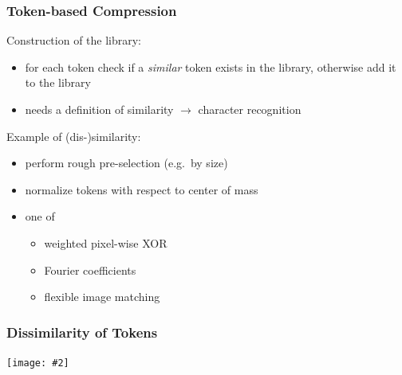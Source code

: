 \documentclass{beamer}
\def\ra{$\rightarrow$ }
\newcommand{\igc}[2]{\centerline{\texttt{[image: \#2]}}}
\begin{document}
\begin{frame}
  \frametitle{Token-based Compression}

Construction of the library:
  \begin{itemize}
  \item for each token check if a {\em similar} token exists in the library,
   otherwise add it to the library
  \item needs a definition of similarity \ra character recognition
  \end{itemize}

Example of (dis-)similarity:
\begin{itemize}
\item perform rough pre-selection (e.g.\ by size)
\item normalize tokens with respect to center of mass
\item one of 
  \begin{itemize}
  \item weighted pixel-wise XOR
  \item Fourier coefficients
  \item flexible image matching
  \end{itemize}
\end{itemize}


\end{frame}


\begin{frame}
  \frametitle{Dissimilarity of Tokens}

\igc{0.9}{templa}

\end{frame}
\end{document}
